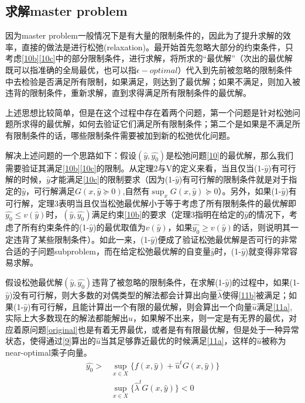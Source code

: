 \documentclass[UTF8,a4]{article}
\begin{document}
\subsection{求解master problem}
因为master problem一般情况下是有大量的限制条件的，因此为了提升求解的效率，直接的做法是进行松弛(relaxation)。最开始首先忽略大部分的约束条件，只考虑\eqref{10b}\eqref{10c}中的部分限制条件，进行求解，将所求的“最优解”（次出的最优解既可以指准确的全局最优，也可以指$\epsilon-optimal$）代入到先前被忽略的限制条件中去检验是否满足所有限制，如果满足，则达到了最优解；如果不满足，则加入被违背的限制条件，重新求解，直到求得满足所有限制条件的最优解。

上述思想比较简单，但是在这个过程中存在着两个问题，第一个问题是针对松弛问题所求得的最优解，如何去验证它们满足所有限制条件；第二个是如果是不满足所有限制条件的话，哪些限制条件需要被加到新的松弛优化问题。

解决上述问题的一个思路如下：假设$(\hat{y},\hat{y_0})$是松弛问题\eqref{10}的最优解，那么我们需要验证其满足\eqref{10b}\eqref{10c}的限制。从定理2与V的定义来看，当且仅当(1-$\hat{y}$)有可行解的时候，$\hat{y}$才能满足\eqref{10c}的限制要求（因为(1-$\hat{y}$)有可行解的限制条件就是对于指定的$\hat{y}$，可行解满足$G(x,\hat{y}\succeq 0)$,自然有$\sup_xG(x,\hat{y})\succeq 0$）。另外，如果(1-$\hat{y}$)有可行解，定理3表明当且仅当松弛最优解小于等于考虑了所有限制条件的最优解即$\hat{y_0}\leqslant v(\hat{y})$时，$(\hat{y},\hat{y_0})$满足约束\eqref{10b}的要求（定理3指明在给定的$\hat{y}$的情况下，考虑了所有约束条件的(1-$\hat{y}$)的最优取值为$v(\hat{y})$，如果$\hat{y_0}\geqslant v(\hat{y})$的话，则说明其一定违背了某些限制条件）。如此一来，(1-$\hat{y}$)便成了验证松弛最优解是否可行的非常合适的子问题subproblem，而在给定松弛最优解的自变量$\hat{y}$时，(1-$\hat{y}$)就变得非常容易求解。

假设松弛最优解$(\hat{y},\hat{y_0})$违背了被忽略的限制条件，在求解(1-$\hat{y}$)的过程中，如果(1-$\hat{y}$)没有可行解，则大多数的对偶类型的解法都会计算出向量$\hat{\lambda}$使得\eqref{11b}被满足；如果(1-$\hat{y}$)有可行解，且能计算出一个有限的最优解，则会算出一个向量$\hat{u}$满足\eqref{11a},实际上大多数现在的解法都能解出$\hat{u}$，如果解不出来，则一定是有无界的最优，对应着原问题\eqref{original}也是有着无界最优，或者是有有限最优解，但是处于一种异常状态，使得通过\eqref{9}算出的$\hat{u}$当其足够靠近最优的时候满足\eqref{11a}，这样的$\hat{u}$被称为near-optimal乘子向量。
\begin{subequations}
\begin{align}
\label{11a}
\hat{y_0}>&\sup_{x\in X}\{f(x,\hat{y})+\hat{u}^tG(x,\hat{y})\}\\
\label{11b}
&\sup_{x\in X}\{\hat{\lambda}^tG(x,\hat{y})\}<0
\end{align}
\end{subequations}
\end{document}
